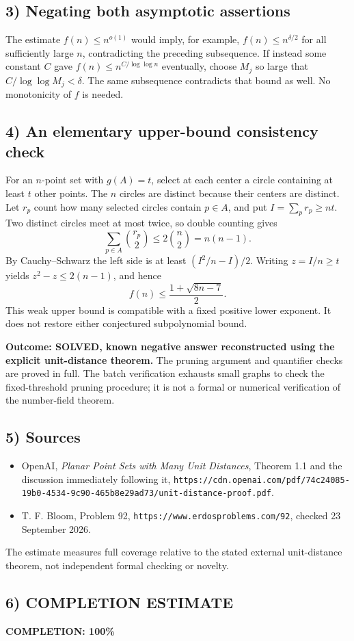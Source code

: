 \subsection{3) Negating both asymptotic assertions}
The estimate $f(n)\leq n^{o(1)}$ would imply, for example,
$f(n)\leq n^{\delta/2}$ for all sufficiently large $n$, contradicting
the preceding subsequence. If instead some constant $C$ gave
$f(n)\leq n^{C/\log\log n}$ eventually, choose $M_j$ so large
that $C/\log\log M_j<\delta$. The same subsequence contradicts
that bound as well. No monotonicity of $f$ is needed.

\subsection{4) An elementary upper-bound consistency check}
For an $n$-point set with $g(A)=t$, select at each center a circle
containing at least $t$ other points. The $n$ circles are distinct
because their centers are distinct. Let $r_p$ count how many selected
circles contain $p\in A$, and put $I=\sum_p r_p\geq nt$.
Two distinct circles meet at most twice, so double counting gives
\[
 \sum_{p\in A}\binom{r_p}{2}\leq2\binom n2=n(n-1).
\]
By Cauchy--Schwarz the left side is at least
$(I^2/n-I)/2$. Writing $z=I/n\geq t$ yields
$z^2-z\leq2(n-1)$, and hence
\[
 f(n)\leq\frac{1+\sqrt{8n-7}}2.
\]
This weak upper bound is compatible with a fixed positive lower
exponent. It does not restore either conjectured subpolynomial bound.

\textbf{Outcome: SOLVED, known negative answer reconstructed using
the explicit unit-distance theorem.} The pruning argument and
quantifier checks are proved in full. The batch verification exhausts
small graphs to check the fixed-threshold pruning procedure; it is
not a formal or numerical verification of the number-field theorem.

\subsection{5) Sources}
\begin{itemize}
\item OpenAI, \emph{Planar Point Sets with Many Unit Distances},
Theorem 1.1 and the discussion immediately following it,
\texttt{https://cdn.openai.com/pdf/74c24085-19b0-4534-9c90-465b8e29ad73/unit-distance-proof.pdf}.
\item T. F. Bloom, Problem 92,
\texttt{https://www.erdosproblems.com/92}, checked 23 September 2026.
\end{itemize}
The estimate measures full coverage relative to the stated external
unit-distance theorem, not independent formal checking or novelty.
\subsection{6) COMPLETION ESTIMATE}
\textbf{COMPLETION: 100\%}
